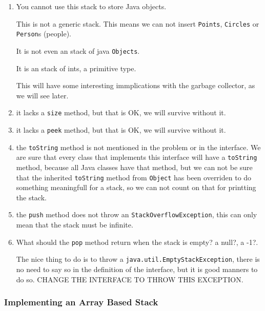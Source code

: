 \documentclass[a4paper, 9pt]{extarticle}
\begin{document}
\begin{enumerate}

  \item You cannot use this stack to store Java objects.

    This is not a generic stack. This means we can not insert
    \texttt{Points}, \texttt{Circles} or \texttt{Person}s (people).

    It is not even an stack of java \texttt{Objects}.

    It is an stack of ints, a primitive type.

    This will have some interesting immplications with the garbage collector,
    as we will see later.

  \item it lacks a \texttt{size} method, but that is OK, we will survive without it.

  \item it lacks a \texttt{peek} method, but that is OK, we will survive without it.

  \item the \texttt{toString} method is not mentioned in the problem or in the
    interface. We are sure that every class that implements this interface will
    have a \texttt{toString} method, because all Java classes have that method,
    but we can not be sure that the inherited \texttt{toString} method from
    \texttt{Object} has been overriden to do something meaningfull for a stack,
    so we can not count on that for printting the stack.

  \item the \texttt{push} method does not throw an
    \texttt{StackOverflowException}, this can only mean that the stack must be
    infinite.

  \item What should the \texttt{pop} method return when the stack is empty? a null?, a -1?.

    The nice thing to do is to throw a \texttt{java.util.EmptyStackException},
    there is no need to say so in the definition of the interface, but it is
    good manners to do so. CHANGE THE INTERFACE TO THROW THIS EXCEPTION.

\end{enumerate}






\subsubsection{Implementing an Array Based Stack}
\end{document}
